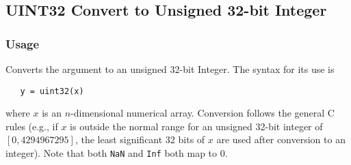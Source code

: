 %
%
%
\subsection{UINT32 Convert to Unsigned 32-bit Integer}
\subsubsection{Usage}
Converts the argument to an unsigned 32-bit Integer.  The syntax
for its use is
\begin{verbatim}
   y = uint32(x)
\end{verbatim}
where $x$ is an $n$-dimensional numerical array.  Conversion
follows the general C rules (e.g., if $x$ is outside the normal
range for an unsigned 32-bit integer of $[0,4294967295]$, the least 
significant 32 bits of $x$ are used after conversion to an integer).  
Note that both \verb|NaN| and \verb|Inf| both map to 0.
